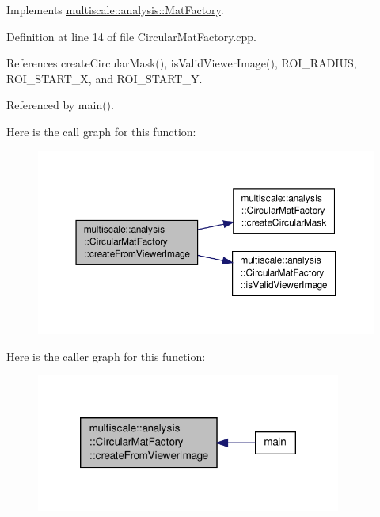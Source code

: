 Implements \hyperlink{classmultiscale_1_1analysis_1_1MatFactory_a719ca9ac925ee182c1d5df1b0b029394}{multiscale\-::analysis\-::\-Mat\-Factory}.



Definition at line 14 of file Circular\-Mat\-Factory.\-cpp.



References create\-Circular\-Mask(), is\-Valid\-Viewer\-Image(), R\-O\-I\-\_\-\-R\-A\-D\-I\-U\-S, R\-O\-I\-\_\-\-S\-T\-A\-R\-T\-\_\-\-X, and R\-O\-I\-\_\-\-S\-T\-A\-R\-T\-\_\-\-Y.



Referenced by main().



Here is the call graph for this function\-:\nopagebreak
\begin{figure}[H]
\begin{center}
\leavevmode
\includegraphics[width=350pt]{classmultiscale_1_1analysis_1_1CircularMatFactory_a8d5fccf946065b982bfa700b9e47b1f5_cgraph}
\end{center}
\end{figure}




Here is the caller graph for this function\-:\nopagebreak
\begin{figure}[H]
\begin{center}
\leavevmode
\includegraphics[width=284pt]{classmultiscale_1_1analysis_1_1CircularMatFactory_a8d5fccf946065b982bfa700b9e47b1f5_icgraph}
\end{center}
\end{figure}



